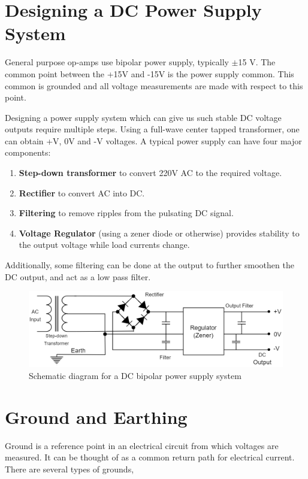 \section{Designing a DC Power Supply System}

General purpose op-amps use bipolar power supply, typically $\pm$15 V. The common point between the +15V and -15V is the power supply common. This common is grounded and all voltage measurements are made with respect to this point.

Designing a power supply system which can give us such stable DC voltage outputs require multiple steps. Using a full-wave center tapped transformer, one can obtain +V, 0V and -V voltages. A typical power supply can have four major components:\\ 

\begin{enumerate}
    \item \textbf{Step-down transformer} to convert 220V AC to the required voltage.
    \item \textbf{Rectifier} to convert AC into DC.
    \item \textbf{Filtering} to remove ripples from the pulsating DC signal.
    \item \textbf{Voltage Regulator} (using a zener diode or otherwise) provides stability to the output voltage while load currents change.
\end{enumerate}

Additionally, some filtering can be done at the output to further smoothen the DC output, and act as a low pass filter.

\begin{figure}[H]
    \centering
    \includegraphics[width=1\columnwidth]{images/ps.drawio.png}
    \caption{Schematic diagram for a DC bipolar power supply system}
    \label{power supply}
\end{figure}

\section{Ground and Earthing}
Ground is a reference point in an electrical circuit from which voltages are measured. It can be thought of as a common return path for electrical current. There are several types of grounds,\\

